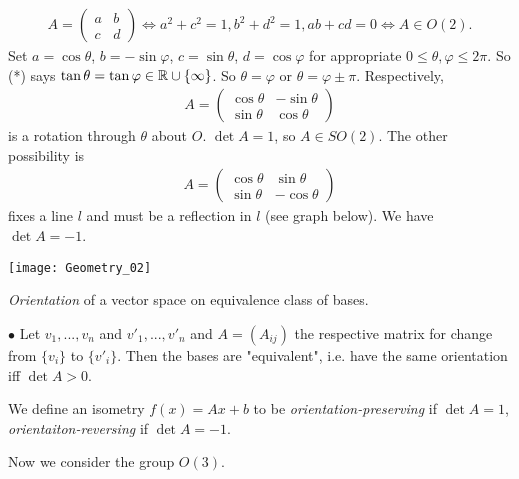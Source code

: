 \documentclass[a4paper]{article}
\begin{document}
\begin{equation*} \tag{*}
\begin{aligned}
A= (\begin{matrix}
a & b\\
c & d
\end{matrix}) \iff a^2+c^2 = 1, b^2+d^2 =1 , ab+cd = 0 \iff A \in O(2).
\end{aligned}
\end{equation*}
Set $a = \cos \theta$, $b = -\sin \varphi$, $c = \sin \theta$, $d=\cos\varphi$ for appropriate $0 \leq \theta,\varphi \leq 2\pi$. So (*) says $\tan\theta = \tan \varphi \in \mathbb{R} \cup \{ \infty\}$. So $\theta = \varphi$ or $\theta = \varphi \pm \pi$. Respectively, 
\begin{equation*}
\begin{aligned}
A=\left(\begin{matrix}
\cos\theta & -\sin\theta\\
\sin\theta & \cos\theta
\end{matrix}\right)
\end{aligned}
\end{equation*}
is a rotation through $\theta$ about $O$. $\det A=1$, so $A \in SO(2)$. The other possibility is
\begin{equation*}
\begin{aligned}
A = \left(\begin{matrix}
\cos\theta & \sin\theta\\
\sin\theta & -\cos\theta
\end{matrix}\right)
\end{aligned}
\end{equation*}
fixes a line $l$ and must be a reflection in $l$ (see graph below). We have $\det A = -1$.

\texttt{[image: Geometry\_02]}


\begin{rem}
\emph{Orientation} of a vector space on equivalence class of bases.

$\bullet$ Let $v_1,...,v_n$ and $v'_1,...,v'_n$ and $A=(A_{ij})$ the respective matrix for change from $\{v_i\}$ to $\{v'_i\}$. Then the bases are "equivalent", i.e. have the same orientation iff $\det A >0$.

We define an isometry $f(x)=Ax+b$ to be \emph{orientation-preserving} if $\det A = 1$, \emph{orientaiton-reversing} if $\det A = -1$.
\end{rem}

Now we consider the group $O(3)$.
\end{document}
